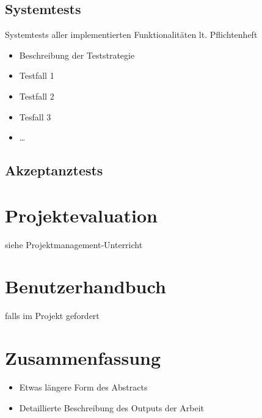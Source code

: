 \section{Systemtests} 
Systemtests aller implementierten Funktionalitäten lt. Pflichtenheft
\begin{itemize}
	\item Beschreibung der Teststrategie
	\item Testfall 1
	\item Testfall 2
	\item Tesfall 3
	\item …
\end{itemize}

\section{Akzeptanztests}

\chapter{Projektevaluation}
siehe Projektmanagement-Unterricht

\chapter{Benutzerhandbuch} 
falls im Projekt gefordert

\chapter{Zusammenfassung}
\begin{itemize}
	\item Etwas längere Form des Abstracts
	\item Detaillierte Beschreibung des Outputs der Arbeit
\end{itemize}